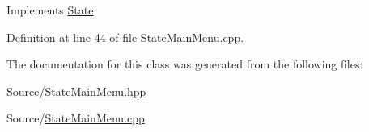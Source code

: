 Implements \hyperlink{class_state_a43d4ca30d927c023316c058b700c0716}{State}.



Definition at line 44 of file State\-Main\-Menu.\-cpp.



The documentation for this class was generated from the following files\-:\begin{DoxyCompactItemize}
\item 
Source/\hyperlink{_state_main_menu_8hpp}{State\-Main\-Menu.\-hpp}\item 
Source/\hyperlink{_state_main_menu_8cpp}{State\-Main\-Menu.\-cpp}\end{DoxyCompactItemize}
